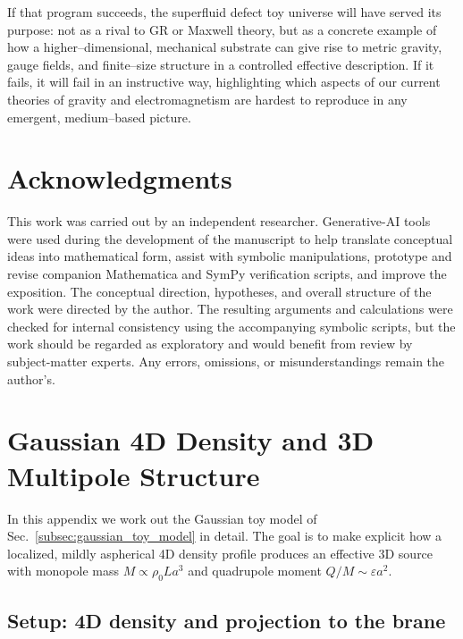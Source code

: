 \documentclass[12pt]{article}
\begin{document}
If that program succeeds, the superfluid defect toy universe will have
served its purpose: not as a rival to GR or Maxwell theory, but as a concrete
example of how a higher--dimensional, mechanical substrate can give rise to
metric gravity, gauge fields, and finite--size structure in a controlled
effective description.  If it fails, it will fail in an instructive way,
highlighting which aspects of our current theories of gravity and
electromagnetism are hardest to reproduce in any emergent, medium--based
picture.

\section*{Acknowledgments}

This work was carried out by an independent researcher. Generative-AI tools were used during the development of the manuscript to help translate conceptual ideas into mathematical form, assist with symbolic manipulations, prototype and revise companion Mathematica and SymPy verification scripts, and improve the exposition. The conceptual direction, hypotheses, and overall structure of the work were directed by the author. The resulting arguments and calculations were checked for internal consistency using the accompanying symbolic scripts, but the work should be regarded as exploratory and would benefit from review by subject-matter experts. Any errors, omissions, or misunderstandings remain the author's.

\appendix

\section{Gaussian 4D Density and 3D Multipole Structure}
\label{app:gaussian_multipoles}

In this appendix we work out the Gaussian toy model of
Sec.~\ref{subsec:gaussian_toy_model} in detail.  The goal is to make
explicit how a localized, mildly aspherical 4D density profile produces an
effective 3D source with monopole mass
$M \propto \rho_0 L a^3$ and quadrupole moment
$Q/M \sim \varepsilon a^2$.

\subsection{Setup: 4D density and projection to the brane}
\end{document}
